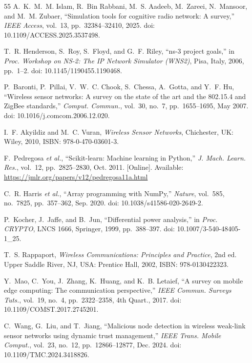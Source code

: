 \documentclass[conference]{IEEEtran}
\begin{document}
\begin{thebibliography}{55}
A.~K.~M.~M. Islam, R.~Bin Rabbani, M.~S. Aadeeb, M.~Zareei, N.~Mansoor, and M.~M. Zubaer, ``Simulation tools for cognitive radio network: A survey,'' \textit{IEEE Access}, vol.~13, pp.~32384--32410, 2025. doi: 10.1109/ACCESS.2025.3537498.

T.~R. Henderson, S.~Roy, S.~Floyd, and G.~F. Riley, ``ns-3 project goals,'' in \textit{Proc. Workshop on NS-2: The IP Network Simulator (WNS2)}, Pisa, Italy, 2006, pp.~1--2. doi: 10.1145/1190455.1190468.

P.~Baronti, P.~Pillai, V.~W.~C. Chook, S.~Chessa, A.~Gotta, and Y.~F. Hu, ``Wireless sensor networks: A survey on the state of the art and the 802.15.4 and ZigBee standards,'' \textit{Comput. Commun.}, vol.~30, no.~7, pp.~1655--1695, May 2007. doi: 10.1016/j.comcom.2006.12.020.

I.~F. Akyildiz and M.~C. Vuran, \textit{Wireless Sensor Networks}, Chichester, UK: Wiley, 2010, ISBN: 978-0-470-03601-3.

F.~Pedregosa \textit{et al.}, ``Scikit-learn: Machine learning in Python,'' \textit{J. Mach. Learn. Res.}, vol.~12, pp.~2825--2830, Oct. 2011. [Online]. Available: \url{https://jmlr.org/papers/v12/pedregosa11a.html}

C.~R. Harris \textit{et al.}, ``Array programming with NumPy,'' \textit{Nature}, vol.~585, no.~7825, pp.~357--362, Sep. 2020. doi: 10.1038/s41586-020-2649-2.

P.~Kocher, J.~Jaffe, and B.~Jun, ``Differential power analysis,'' in \textit{Proc. CRYPTO}, LNCS 1666, Springer, 1999, pp.~388--397. doi: 10.1007/3-540-48405-1\_25.

T.~S. Rappaport, \textit{Wireless Communications: Principles and Practice}, 2nd ed. Upper Saddle River, NJ, USA: Prentice Hall, 2002, ISBN: 978-0130422323.

Y.~Mao, C.~You, J.~Zhang, K.~Huang, and K.~B. Letaief, ``A survey on mobile edge computing: The communication perspective,'' \textit{IEEE Commun. Surveys Tuts.}, vol.~19, no.~4, pp.~2322--2358, 4th Quart., 2017. doi: 10.1109/COMST.2017.2745201.

C.~Wang, G.~Liu, and T.~Jiang, ``Malicious node detection in wireless weak-link sensor networks using dynamic trust management,'' \textit{IEEE Trans. Mobile Comput.}, vol.~23, no.~12, pp.~12866--12877, Dec. 2024. doi: 10.1109/TMC.2024.3418826.


\end{thebibliography}
\end{document}
